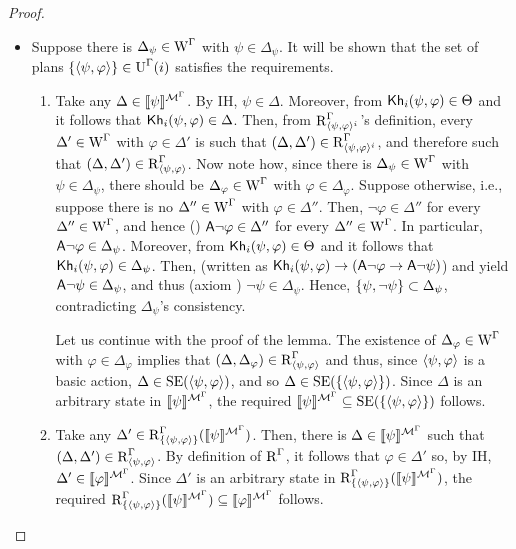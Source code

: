 \begin{proof}
\begin{itemize}
\begin{itemize}
\item Suppose there is $\Delta_\psi \in \operatorname{W}^\Gamma$ with $\psi \in \Delta_\psi$. It will be shown that the set of plans $\{ \langle \psi, \varphi \rangle \} \in \operatorname{U}^\Gamma(i)$ satisfies the requirements.
\begin{enumerate}
\item Take any $\Delta \in \llbracket \psi \rrbracket^{\mathcal{M}^\Gamma}$. By IH, $\psi \in \Delta$.
Moreover, from ${\sf Kh}_i(\psi, \varphi) \in \Theta$ and  it follows that ${\sf Kh}_i(\psi, \varphi) \in \Delta$.
Then, from $\operatorname{R}^\Gamma_{\langle \psi,\varphi \rangle^i}$'s definition, every $\Delta' \in \operatorname{W}^\Gamma$ with $\varphi \in \Delta'$ is such that $(\Delta, \Delta') \in \operatorname{R}^\Gamma_{\langle \psi,\varphi \rangle^i}$, and therefore such that $(\Delta, \Delta') \in \operatorname{R}^\Gamma_{\langle \psi,\varphi \rangle}$.
Now note how, since there is $\Delta_\psi \in \operatorname{W}^\Gamma$ with $\psi \in \Delta_\psi$, there should be $\Delta_\varphi \in \operatorname{W}^\Gamma$ with $\varphi \in \Delta_\varphi$.
Suppose otherwise, i.e., suppose there is no $\Delta'' \in \operatorname{W}^\Gamma$ with $\varphi \in \Delta''$. Then, $\lnot \varphi \in \Delta''$ for every $\Delta'' \in \operatorname{W}^\Gamma$, and hence () ${\sf A}\lnot\varphi \in \Delta''$ for every $\Delta'' \in \operatorname{W}^\Gamma$.
In particular, ${\sf A}\lnot\varphi \in \Delta_\psi$. Moreover, from ${\sf Kh}_i(\psi, \varphi) \in \Theta$ and  it follows that ${\sf Kh}_i(\psi, \varphi) \in \Delta_\psi$. Then,  (written as ${\sf Kh}_i(\psi, \varphi) \rightarrow ({\sf A}\lnot \varphi \rightarrow {\sf A} \lnot \psi)$) and  yield ${\sf A}\lnot\psi \in \Delta_\psi$, and thus (axiom ) $\lnot\psi \in \Delta_\psi$.
Hence, $\{ \psi, \lnot\psi \} \subset \Delta_\psi$, contradicting $\Delta_\psi$'s consistency.

Let us continue with the proof of the lemma. The existence of $\Delta_\varphi \in \operatorname{W}^\Gamma$ with $\varphi \in \Delta_\varphi$ implies that $(\Delta, \Delta_\varphi) \in \operatorname{R}^\Gamma_{\langle \psi,\varphi \rangle}$ and thus, since $\langle \psi,\varphi \rangle$ is a basic action, $\Delta \in \operatorname{SE}(\langle \psi,\varphi \rangle)$, and so $\Delta \in \operatorname{SE}(\{ \langle \psi,\varphi \rangle \})$. Since $\Delta$ is an arbitrary state in $\llbracket \psi \rrbracket^{\mathcal{M}^\Gamma}$, the required $\llbracket \psi \rrbracket^{\mathcal{M}^\Gamma} \subseteq \operatorname{SE}(\{ \langle \psi,\varphi \rangle \})$ follows.

\item Take any $\Delta' \in \operatorname{R}^\Gamma_{\{ \langle \psi,\varphi \rangle \}}(\llbracket \psi \rrbracket^{\mathcal{M}^\Gamma})$. Then, there is $\Delta \in \llbracket \psi \rrbracket^{\mathcal{M}^\Gamma}$ such that $(\Delta, \Delta') \in \operatorname{R}^\Gamma_{\langle \psi,\varphi \rangle}$. By definition of $\operatorname{R}^\Gamma$, it follows that $\varphi \in \Delta'$ so, by IH, $\Delta' \in \llbracket \varphi \rrbracket^{\mathcal{M}^\Gamma}$. Since $\Delta'$ is an arbitrary state in $\operatorname{R}^\Gamma_{\{ \langle \psi,\varphi \rangle \}}(\llbracket \psi \rrbracket^{\mathcal{M}^\Gamma})$, the required $\operatorname{R}^\Gamma_{\{ \langle \psi,\varphi \rangle \}}(\llbracket \psi \rrbracket^{\mathcal{M}^\Gamma}) \subseteq \llbracket \varphi \rrbracket^{\mathcal{M}^\Gamma}$ follows.
\end{enumerate}
\end{itemize}
\end{itemize}
\end{proof}

